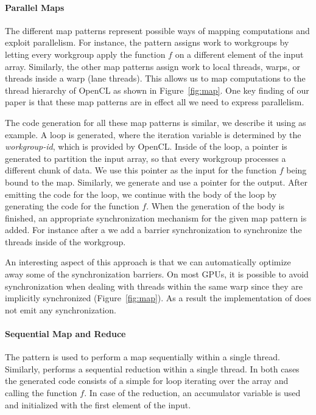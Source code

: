 \paragraph{Parallel Maps}

The different map patterns represent possible ways of mapping computations and exploit parallelism.
For instance, the  pattern assigns work to workgroups by letting every workgroup apply the function $f$ on a different element of the input array.
Similarly, the other map patterns assign work to local threads, warps, or threads inside a warp (lane threads).
This allows us to map computations to the thread hierarchy of OpenCL as shown in Figure~\ref{fig:map}.
One key finding of our paper is that these map patterns are in effect all we need to express parallelism.

The code generation for all these map patterns is similar, we describe it using  as example.
A loop is generated, where the iteration variable is determined by the \emph{workgroup-id}, which is provided by OpenCL.
Inside of the loop, a pointer is generated to partition the input array, so that every workgroup processes a different chunk of data.
We use this pointer as the input for the function $f$ being bound to the map.
Similarly, we generate and use a pointer for the output.
After emitting the code for the loop, we continue with the body of the loop by generating the code for the function $f$.
When the generation of the body is finished, an appropriate synchronization mechanism for the given map pattern is added.
For instance after a  we add a barrier synchronization to synchronize the threads inside of the workgroup.

An interesting aspect of this approach is that we can automatically optimize away some of the synchronization barriers.
On most GPUs, it is possible to avoid synchronization when dealing with threads within the same warp since they are implicitly synchronized (Figure~\ref{fig:map}).
As a result the implementation of  does not emit any synchronization.



\paragraph{Sequential Map and Reduce}
The  pattern is used to perform a map sequentially within a single thread.
Similarly,  performs a sequential reduction within a single thread.
In both cases the generated code consists of a simple for loop iterating over the array and calling the function $f$.
In case of the reduction, an accumulator variable is used and initialized with the first element of the input.

